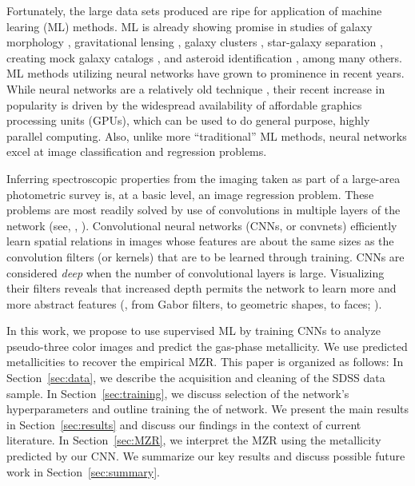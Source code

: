 \documentclass[fleqn,usenatbib]{mnras}
\begin{document}
Fortunately, the large data sets produced are ripe for application of machine learing (ML) methods. ML is already showing promise in studies of galaxy morphology , gravitational lensing , galaxy clusters , star-galaxy separation , creating mock galaxy catalogs , and asteroid identification , among many others. ML methods utilizing neural networks have grown to prominence in recent years. While neural networks are a relatively old technique , their recent increase in popularity is driven by the widespread availability of affordable graphics processing units (GPUs), which can be used to do general purpose, highly parallel computing. Also, unlike more ``traditional'' ML methods, neural networks excel at image classification and regression problems.

Inferring spectroscopic properties from the imaging taken as part of a large-area photometric survey is, at a basic level, an image regression problem. These problems are most readily solved by use of convolutions in multiple layers of the network (see, \eg, \citealt{Krizhevsky2012}). Convolutional neural networks (CNNs, or convnets) efficiently learn spatial relations in images whose features are about the same sizes as the convolution filters (or kernels) that are to be learned through training. CNNs are considered \textit{deep} when the number of convolutional layers is large. Visualizing their filters reveals that increased depth permits the network to learn more and more abstract features (\eg, from Gabor filters, to geometric shapes, to faces; \citealt{Zeiler2014}).

In this work, we propose to use supervised ML by training CNNs to analyze pseudo-three color images and predict the gas-phase metallicity. We use predicted metallicities to recover the empirical \cite{Tremonti2004} MZR. This paper is organized as follows: In Section~\ref{sec:data}, we describe the acquisition and cleaning of the SDSS data sample. In Section~\ref{sec:training}, we discuss selection of the network's hyperparameters and outline training the of network. We present the main results in Section~\ref{sec:results} and discuss our findings in the context of current literature. In Section~\ref{sec:MZR}, we interpret the MZR using the metallicity predicted by our CNN. We summarize our key results and discuss possible future work in Section~\ref{sec:summary}.
\end{document}
